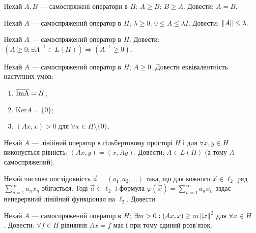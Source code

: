 
\begin{exercise}
    Нехай $A, B$ --- самоспряжені оператори в $H$; $A \geq B$; $B \geq A$.
    Довести: $A = B$.
\end{exercise}

\begin{exercise}
    Нехай $A$ --- самоспряжений оператор в $H$; $\lambda \geq 0$; $0 \leq A \leq \lambda I$.
    Довести: $\left\lVert A\right\rVert \leq \lambda$.
\end{exercise}

\begin{exercise}
    Нехай $A$ --- самоспряжений оператор в $H$. Довести:
    $ (A \geq 0; \exists A^{-1} \in L(H)) \Rightarrow (A^{-1} \geq 0)$.
\end{exercise}

\begin{exercise}
    Нехай $A$ --- самоспряжений оператор в $H$; $A \geq 0$. Довести еквівалентність наступних умов:
    \begin{enumerate}[label=\ukr*)]
        \item $\overline{\rm \mathrm{Im}A} = H$;
        \item $\mathrm{Ker}A = \{0\}$;
        \item $(Ax, x) > 0$ для $\forall x \in H \setminus \{0\}$.
    \end{enumerate}
\end{exercise}

\begin{exercise}
    Нехай $A$ --- лінійний оператор в гільбертовому просторі $H$ і для $\forall x, y \in H$ виконується
    рівність: $(Ax, y) = (x, Ay)$. Довести: $A \in L(H)$ (а тому $A$ --- самоспряжений).
\end{exercise}

\begin{exercise}
    Нехай числова послідовність $\vec{a} = (a_1, a_2, \dots)$ така, що для кожного $\vec{x} \in \ell_2$
    ряд $\sum\limits_{n = 1}^\infty a_n x_n$ збігається. Тоді $\vec{a} \in \ell_2$ і формула 
    $\varphi(\vec{x}) = \sum\limits_{n = 1}^\infty a_n x_n$ задає неперервний лінійний функціонал на $\ell_2$.
    Довести.
\end{exercise}

\begin{exercise}\label{N:1_3_41}
    Нехай $A$ --- самоспряжений оператор в $H$; $\exists m > 0: (Ax, x) \geq m \left\lVert x\right\rVert^2$ для $\forall x \in H$.
    Довести: $\forall f \in H$ рівняння $Ax = f$ має і при тому єдиний розв'язок.
\end{exercise}

